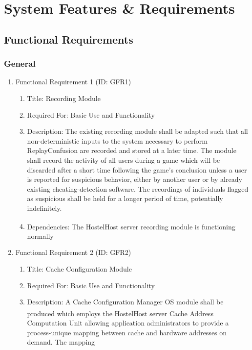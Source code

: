 \documentclass[12pt]{article}
\begin{document}
\section {System Features \& Requirements}

\subsection{Functional Requirements}

\subsubsection{General}

\begin{enumerate}
    \item Functional Requirement 1 (ID: GFR1)
    \begin{enumerate}
        \item Title: Recording Module
        \item Required For: Basic Use and Functionality
        \item Description: The existing recording module shall be adapted such that all non-deterministic
        inputs to the system necessary to perform ReplayConfusion are recorded and stored at a later time.
        The module shall record the activity of all users during a game which will be discarded after a short
        time following the game’s conclusion unless a user is reported for suspicious behavior, either by
        another user or by already existing cheating-detection software. The recordings of individuals flagged
        as suspicious shall be held for a longer period of time, potentially indefinitely.
        \item Dependencies: The HostelHost\textsuperscript{\tiny\textregistered} server recording module is
        functioning normally
    \end{enumerate}
    \item Functional Requirement 2 (ID: GFR2)
    \begin{enumerate}
        \item Title: Cache Configuration Module
        \item Required For: Basic Use and Functionality
        \item Description: A Cache Configuration Manager OS module shall be produced which employs the
        HostelHost\textsuperscript{\tiny\textregistered} server Cache Address Computation Unit allowing application
        administrators to provide a process-unique mapping between cache and hardware addresses on demand. The mapping

\end{enumerate}
\end{enumerate}
\end{document}
